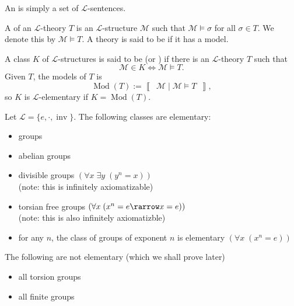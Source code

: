 \documentclass[notoc,notitlepage]{tufte-book}
\newcommand{\class}[1]{\left\llbracket \enspace #1 \enspace \right\rrbracket}
\DeclareMathOperator{\Mod}{Mod }
\DeclareMathOperator{\inv}{inv}
\begin{document}
\begin{defn}\label{defn:_l_theory}
  An  is simply a set of $\mathcal{L}$-sentences.
\end{defn}

\begin{defn}[Model]\label{defn:model}
  A  of an $\mathcal{L}$-theory $T$ is an $\mathcal{L}$-structure $\mathcal{M}$ such that $\mathcal{M} \models \sigma$ for all $\sigma \in T$. We denote this by $\mathcal{M} \models T$. A theory is said to be  if it has a model.
\end{defn}

\begin{defn}\label{defn:l_axiomatizable}
  A class $K$ of $\mathcal{L}$-structures is said to be  (or ) if there is an $\mathcal{L}$-theory $T$ such that
  \begin{equation*}
    \mathcal{M} \in K \iff \mathcal{M} \models T.
  \end{equation*}
  Given $T$, the models of $T$ is
  \begin{equation*}
    \Mod(T) := \class{ \mathcal{M} \mid \mathcal{M} \models T },
  \end{equation*}
  so $K$ is $\mathcal{L}$-elementary if $K = \Mod(T)$.
\end{defn}

\begin{eg}
  Let $\mathcal{L} = \{ e, \cdot, \inv \}$. The following classes are elementary:
  \begin{itemize}
    \item groups
    \item abelian groups
    \item divisible groups $(\forall x \; \exists y \; (y^n = x))$ \\
      (note: this is infinitely axiomatizable)
    \item torsian free groups $(\forall x \; (x^n = e \rarrow x = e))$ \\
      (note: this is also infinitely axiomatizble)
    \item for any $n$, the class of groups of exponent $n$ is elementary $(\forall x \; (x^n = e))$
  \end{itemize}
  The following are not elementary (which we shall prove later)
  \begin{itemize}
    \item all torsion groups
    \item all finite groups
  \end{itemize}
\end{eg}
\end{document}
